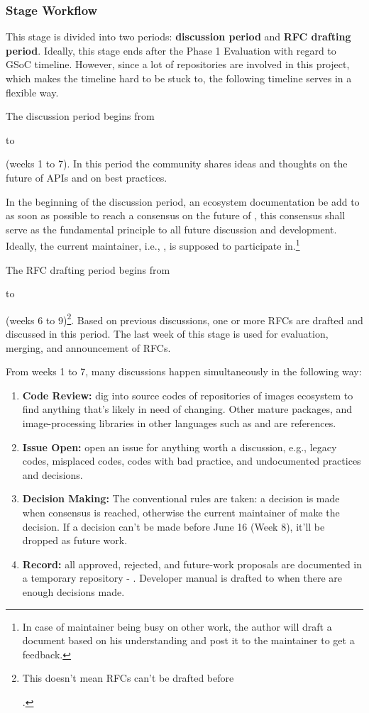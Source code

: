 \subsubsection*{Stage Workflow}

This stage is divided into two periods: \textbf{discussion period} and \textbf{RFC drafting period}. Ideally, this stage ends after the \textsf{Phase 1 Evaluation} with regard to GSoC timeline. However, since a lot of repositories are involved in this project, which makes the timeline hard to be stuck to, the following timeline serves in a flexible way.\par

The discussion period begins from \date{April 22} to \date{June 9} (weeks 1 to 7). In this period the community shares ideas and thoughts on the future of APIs and on best practices.\par

In the beginning of the discussion period, an ecosystem documentation be add to \repoimagesgithubio{} as soon as possible to reach a consensus on the future of \images{}, this consensus shall serve as the fundamental principle to all future discussion and development. Ideally, the current \images{} maintainer, i.e., \timholy, is supposed to participate in.\footnote{In case of maintainer being busy on other work, the author will draft a document based on his understanding and post it to the maintainer to get a feedback.}\par

The RFC drafting period begins from \date{May 27} to \date{June 23} (weeks 6 to 9)\footnote{This doesn't mean RFCs can't be drafted before \date{May 27}.}. Based on previous discussions, one or more RFCs are drafted and discussed in this period. The last week of this stage is used for evaluation, merging, and announcement of RFCs.\par

From weeks 1 to 7, many discussions happen simultaneously in the following way:
\begin{enumerate}
    \item \textbf{Code Review:} dig into source codes of repositories of images ecosystem to find anything that's likely in need of changing. Other mature \langjulia{} packages, and image-processing libraries in other languages such as \reposcikitimage{} and \matlabimageprocessing{} are references.
    \item \textbf{Issue Open:} open an issue for anything worth a discussion, e.g., legacy codes, misplaced codes, codes with bad practice, and undocumented practices and decisions.
    \item \textbf{Decision Making:} The conventional rules are taken: a decision is made when consensus is reached, otherwise the current maintainer of \images{} make the decision. If a decision can't be made before June 16 (Week 8), it'll be dropped as future work.
    \item \textbf{Record:} all approved, rejected, and future-work proposals are documented in a temporary repository - \repogsoctempdoc{}. Developer manual is drafted to \repoimagesgithubio{} when there are enough decisions made.
\end{enumerate}

